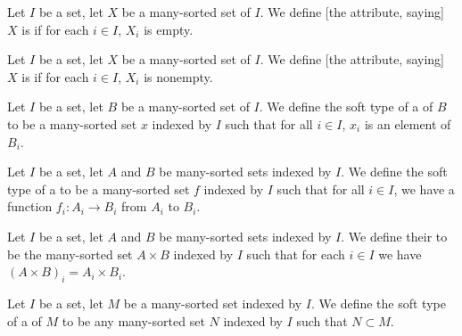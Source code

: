 
\begin{definition}
Let $I$ be a set, let $X$ be a many-sorted set of $I$.
We define [the attribute, saying] $X$ is 
if for each $i\in I$, $X_{i}$ is empty.
\end{definition}


\begin{definition}
Let $I$ be a set, let $X$ be a many-sorted set of $I$.
We define [the attribute, saying] $X$ is 
if for each $i\in I$, $X_{i}$ is nonempty.
\end{definition}

\begin{definition}
Let $I$ be a set, let $B$ be a many-sorted set of $I$.
We define the soft type of a  of $B$ to be a
many-sorted set $x$ indexed by $I$ such that for all $i\in I$, $x_{i}$
is an element of $B_{i}$.
\end{definition}

\begin{definition}
Let $I$ be a set, let $A$ and $B$ be many-sorted sets indexed by $I$.
We define the soft type of a 
to be a many-sorted set $f$ indexed by $I$ such that for all $i\in I$,
we have a function $f_{i}\colon A_{i}\to B_{i}$ from $A_{i}$ to $B_{i}$.
\end{definition}

\begin{definition}
Let $I$ be a set, let $A$ and $B$ be many-sorted sets indexed by $I$.
We define their  to be the many-sorted set
$A\times B$ indexed by $I$ such that for each $i\in I$ we have
$(A\times B)_{i}=A_{i}\times B_{i}$.
\end{definition}

\begin{definition}
Let $I$ be a set, let $M$ be a many-sorted set indexed by $I$.
We define the soft type of a  of $M$ to be
any many-sorted set $N$ indexed by $I$ such that $N\subset M$.
\end{definition}